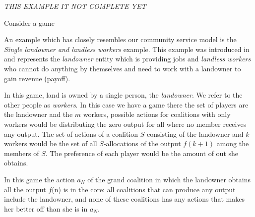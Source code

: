 
            \emph {THIS EXAMPLE IT NOT COMPLETE YET}

            \begin{example}\label{ex:simplecore1}
                Consider a game 

            \end{example}

            \begin{example}\label{ex:simplecore2}

                An example which has closely resembles our community service model is the \emph{Single landowner and landless workers} example.
                This example was introduced in \cite{GVK369342747} and represents the \emph{landowner} entity which is providing jobs and \emph{landless workers} who cannot do anything by themselves and need to work with a landowner to gain revenue (payoff).

                In this game, land is owned by a single person, the \emph{landowner}. We refer to the other people as \emph{workers}. In this case we have a game there the set of players are the landowner and the $m$ workers, possible actions for coalitions with only workers would be distributing the zero output for all where no member receives any output. The set of actions of a coalition $S$ consisting of the landowner and $k$ workers would be the set of all $S$-allocations of the output $f(k+1)$ among the members of $S$. The preference of each player would be the amount of out she obtains.

                In this game the action $a_{N}$ of the grand coalition in which the landowner obtains all the output $f$(n)
                is in the core: all coalitions that can produce any output include the landowner, and none of these
                coalitions has any actions that makes her better off than she is in $a_{N}$.


\end{example}
